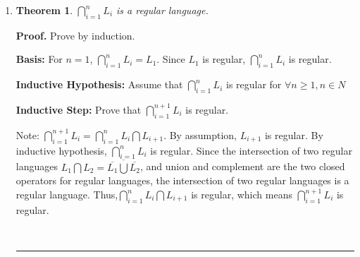 \documentclass{article}%
\newtheorem{theorem}{Theorem}
\newenvironment{proof}[1][Proof]{\textbf{#1.} }{\ \rule{0.5em}{0.5em}}
\begin{document}
\begin{enumerate}
\begin{enumerate}
\begin{proof}
    \begin{enumerate}
	\item \textbf{Regular:} Let $L_1 = 0^1,L_2=0^2,\ldots,L_n=0^n,\ldots$. Each $L$ is a finite sequence of 0s, so each $L$ is a regular language. The union $\bigcup\limits_{i = 1}^\infty {L_i } = 0^*$, which is a regular language. Thus,  $\bigcup\limits_{i = 1}^\infty {L_i }$ is regular.
	\item \textbf{Non-regular:} Let $L_1 = 0^4, L_2 = 0^6,L_3 = 0^8, \ldots, L_n = 0^{composite}, \ldots$. Since each $L$ is a finite sequence of 0s, they are regular languages. The union of all these regular languages that have composite number of 0s is a non-regular language, $L = \{0^{composite}\}$, which is proved in the class.
    
    \end{enumerate} 
   
    
    \end{proof}
		
	  \item 
    \begin{theorem}
      $\bigcap\limits_{i = 1}^n {L_i } $ is a regular language.
    
    \end{theorem}	
    \begin{proof}
      Prove by induction.
    
    \textbf{Basis:} For $n = 1$, $\bigcap\limits_{i = 1}^n {L_i }=L_1$. Since $L_1$ is regular, $\bigcap\limits_{i = 1}^n {L_i }$ is regular.
     
    \textbf{Inductive Hypothesis:} Assume that $\bigcap\limits_{i = 1}^n {L_i }$ is regular for $\forall n \geq 1, n \in N$
    
    \textbf{Inductive Step:} Prove that $\bigcap\limits_{i = 1}^{n+1} {L_i }$ is regular.
    
    Note: $\bigcap\limits_{i = 1}^{n+1} {L_i } = \bigcap\limits_{i = 1}^n {L_i } \bigcap L_{i+1}$. By assumption, $L_{i+1}$ is regular. By inductive hypothesis, $\bigcap\limits_{i = 1}^n {L_i }$ is regular. Since the intersection of two regular languages $L_1 \bigcap L_2 = \overline{\overline{L_1} \bigcup \overline{L_2}} $, and union and complement are the two closed operators for regular languages, the intersection of two regular languages is a regular language. Thus,$\bigcap\limits_{i = 1}^n {L_i } \bigcap L_{i+1}$ is regular, which means $\bigcap\limits_{i = 1}^{n+1} {L_i }$ is regular.
   
    
    \end{proof}
    

\end{enumerate}
\end{enumerate}
\end{document}
